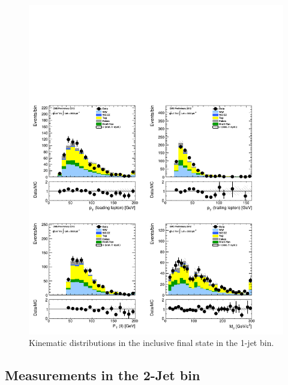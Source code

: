 \begin{figure}[!hbtp]
\centering
\includegraphics[width=1\textwidth]{figures/ww_analysis20_0_ALL_incl_1j.pdf}
\caption{Kinematic distributions in the inclusive final state in the 1-jet bin.}
\label{fig:xs_kinematics_incl_1j}
\end{figure}

\clearpage
\subsection{Measurements in the 2-Jet bin}

